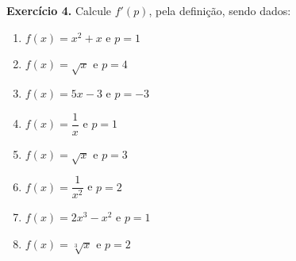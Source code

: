\vspace{0.6cm}
\noindent\textbf{Exercício 4.} Calcule $f'(p)$, pela definição, sendo dados:
\begin{enumerate}[label=\alph*)]
    \item $f(x) = x^2 + x$ e $p = 1$
    \item $f(x) = \sqrt{x}$ e $p = 4$
    \item $f(x) = 5x - 3$ e $p = -3$
    \item $f(x) = \dfrac{1}{x}$ e $p = 1$
    \item $f(x) = \sqrt{x}$ e $p = 3$
    \item $f(x) = \dfrac{1}{x^2}$ e $p = 2$
    \item $f(x) = 2x^3 - x^2$ e $p = 1$
    \item $f(x) = \sqrt[3]{x}$ e $p = 2$
\end{enumerate}
\setcounter{equation}{0}

